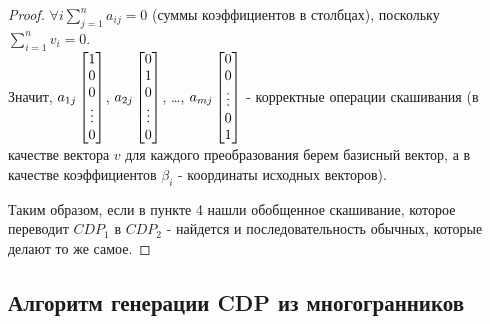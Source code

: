 \documentclass[16pt]{article}
\theoremstyle{definition}
\begin{document}
\begin{proof}
$\forall i \sum_{j=1}^na_{ij} = 0$ (суммы коэффициентов в столбцах), поскольку $\sum_{i=1}^{n} v_i = 0$. 
\\
Значит, $a_{1j}\begin{bmatrix} 1 \\ 0 \\ 0 \\ \vdots \\ 0 \end{bmatrix}$, $a_{2j}\begin{bmatrix} 0 \\ 1 \\ 0 \\ \vdots \\ 0 \end{bmatrix}$, \dots, $a_{mj}\begin{bmatrix} 0 \\ 0 \\ \vdots \\ 0 \\ 1 \end{bmatrix}$ -  корректные операции скашивания (в качестве вектора $v$ для каждого преобразования берем базисный вектор, а в качестве коэффициентов $\beta_i$ - координаты исходных векторов).

Таким образом, если в пункте 4 нашли обобщенное скашивание, которое переводит $CDP_1$ в $CDP_2$ - найдется и последовательность обычных, которые делают то же самое.
\end{proof}

\subsection{Алгоритм генерации CDP из многогранников}
\end{document}

